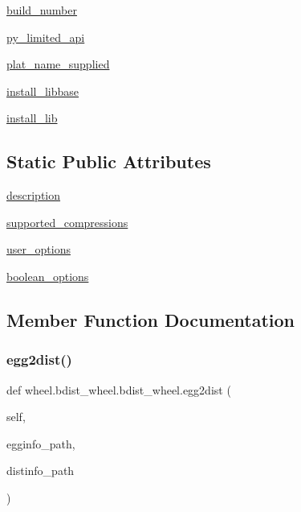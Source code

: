 \begin{DoxyCompactItemize}
\item 
\hyperlink{classwheel_1_1bdist__wheel_1_1bdist__wheel_a661594203d0622f5b7d130e67c067afb}{build\+\_\+number}
\item 
\hyperlink{classwheel_1_1bdist__wheel_1_1bdist__wheel_a6459251d7a8a39313155eb63b491ff4a}{py\+\_\+limited\+\_\+api}
\item 
\hyperlink{classwheel_1_1bdist__wheel_1_1bdist__wheel_aea6a44e41d005315f07b6ec57c1caa03}{plat\+\_\+name\+\_\+supplied}
\item 
\hyperlink{classwheel_1_1bdist__wheel_1_1bdist__wheel_a3533e8ea1e6e55733378aab6abbf82f6}{install\+\_\+libbase}
\item 
\hyperlink{classwheel_1_1bdist__wheel_1_1bdist__wheel_a3fad29ae2c890b58cbfc88f9f3d02aaf}{install\+\_\+lib}
\end{DoxyCompactItemize}
\subsection*{Static Public Attributes}
\begin{DoxyCompactItemize}
\item 
\hyperlink{classwheel_1_1bdist__wheel_1_1bdist__wheel_a7e5484d0481ed0807a9c3363134bc9db}{description}
\item 
\hyperlink{classwheel_1_1bdist__wheel_1_1bdist__wheel_a9cd50d93b4d8c4e260dd7d4eecedb506}{supported\+\_\+compressions}
\item 
\hyperlink{classwheel_1_1bdist__wheel_1_1bdist__wheel_adf72e5e4b89c77a57bb1b18862742cf6}{user\+\_\+options}
\item 
\hyperlink{classwheel_1_1bdist__wheel_1_1bdist__wheel_a34691db4c857ad1f00ca274dee85639f}{boolean\+\_\+options}
\end{DoxyCompactItemize}


\subsection{Member Function Documentation}
\mbox{\label{classwheel_1_1bdist__wheel_1_1bdist__wheel_ad311a5eef9c0bddfa1dde103b7f8b06b}} 
\subsubsection{\texorpdfstring{egg2dist()}{egg2dist()}}
{\footnotesize\ttfamily def wheel.\+bdist\+\_\+wheel.\+bdist\+\_\+wheel.\+egg2dist (\begin{DoxyParamCaption}\item[{}]{self,  }\item[{}]{egginfo\+\_\+path,  }\item[{}]{distinfo\+\_\+path }\end{DoxyParamCaption})}

